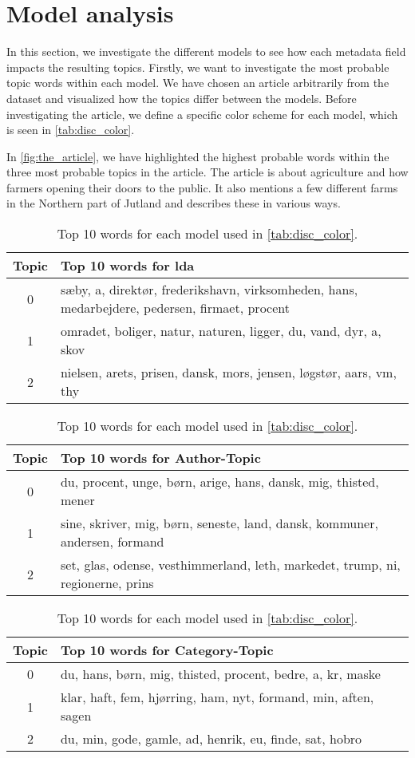 \section{Model analysis}\label{sec:discussion}
In this section, we investigate the different models to see how each metadata field impacts the resulting topics.
Firstly, we want to investigate the most probable topic words within each model.
We have chosen an article arbitrarily from the dataset and visualized how the topics differ between the models. 
Before investigating the article, we define a specific color scheme for each model, which is seen in \autoref{tab:disc_color}.

In \autoref{fig:the_article}, we have highlighted the highest probable words within the three most probable topics in the article.
The article is about agriculture and how farmers opening their doors to the public. 
It also mentions a few different farms in the Northern part of Jutland and describes these in various ways.

\begin{table}
	\caption{Top 10 words for each model used in \autoref{tab:disc_color}.}
	\label{tab:top_words_three_models}
	\begin{tabular}{c|p{}}
		Topic & Top 10 words for \gls{lda} \\
		\midrule
		0 & sæby, a, direktør, frederikshavn, virksomheden, hans, medarbejdere, pedersen, firmaet, procent \\
		1 & omradet, boliger, natur, naturen, ligger, du, vand, dyr, a, skov \\
		2 & nielsen, arets, prisen, dansk, mors, jensen, løgstør, aars, vm, thy \\
	\end{tabular}
	\begin{tabular}{c|p{}}
		\midrule
		Topic & Top 10 words for Author-Topic \\
		\midrule
		0 & du, procent, unge, børn, arige, hans, dansk, mig, thisted, mener\\
		1 & sine, skriver, mig, børn, seneste, land, dansk, kommuner, andersen, formand \\
		2 & set, glas, odense, vesthimmerland, leth, markedet, trump, ni, regionerne, prins\\
	\end{tabular}
	\begin{tabular}{c|p{}}
		\midrule
		Topic & Top 10 words for Category-Topic \\
		\midrule
		0 & du, hans, børn, mig, thisted, procent, bedre, a, kr, maske \\
		1 & klar, haft, fem, hjørring, ham, nyt, formand, min, aften, sagen\\
		2 & du, min, gode, gamle, ad, henrik, eu, finde, sat, hobro\\
	\end{tabular}
\end{table}

